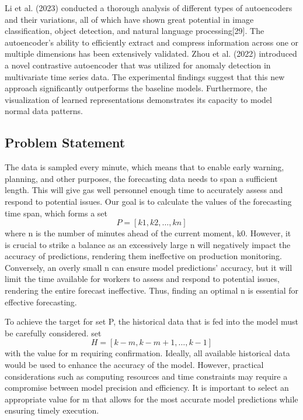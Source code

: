 \documentclass[sn-mathphys,Numbered]{sn-jnl}%
\theoremstyle{thmstyleone}%
\theoremstyle{thmstyletwo}%
\theoremstyle{thmstylethree}%
\begin{document}
Li et al. (2023) conducted a thorough analysis of different types of autoencoders and their variations, all of which have shown great potential in image classification, object detection, and natural language processing[29]. The autoencoder's ability to efficiently extract and compress information across one or multiple dimensions has been extensively validated. Zhou et al. (2022) introduced a novel contrastive autoencoder that was utilized for anomaly detection in multivariate time series data. The experimental findings suggest that this new approach significantly outperforms the baseline models. Furthermore, the visualization of learned representations demonstrates its capacity to model normal data patterns.

\subsection{Problem Statement}\label{subsec6}


The data is sampled every minute, which means that to enable early warning, planning, and other purposes, the forecasting data needs to span a sufficient length. This will give gas well personnel enough time to accurately assess and respond to potential issues. Our goal is to calculate the values of the forecasting time span, which forms a set
\begin{equation}
P=[ k1, k2, …, kn]
\end{equation}
where n is the number of minutes ahead of the current moment, k0. However, it is crucial to strike a balance as an excessively large n will negatively impact the accuracy of predictions, rendering them ineffective on production monitoring. Conversely, an overly small n can ensure model predictions' accuracy, but it will limit the time available for workers to assess and respond to potential issues, rendering the entire forecast ineffective. Thus, finding an optimal n is essential for effective forecasting.


To achieve the target for set P, the historical data that is fed into the model must be carefully considered. set 
\begin{equation}
H=[ k-m, k-m+1, …, k-1 ]
\end{equation}
with the value for m requiring confirmation. Ideally, all available historical data would be used to enhance the accuracy of the model. However, practical considerations such as computing resources and time constraints may require a compromise between model precision and efficiency. It is important to select an appropriate value for m that allows for the most accurate model predictions while ensuring timely execution.
\end{document}
